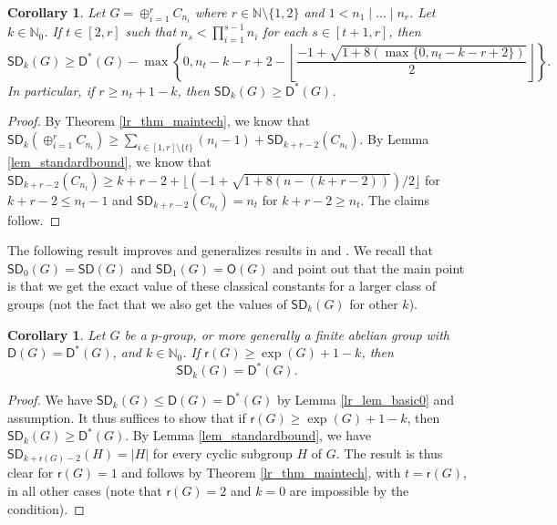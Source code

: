 \documentclass{amsart}
\newtheorem{co}[thm]{Corollary}
\theoremstyle{definition}
\numberwithin{equation}{section}
\begin{document}
\begin{co}
\label{lr_co_gen}
Let $G = \oplus_{i=1}^r C_{n_i}$ where $r\in \mathbb{N}\setminus \{1,2\}$ and $1 < n_1 \mid \dots \mid n_r$. Let $k \in \mathbb{N}_0$.
If $t \in [2,r]$ such that $n_{s} < \prod_{i=1}^{s-1} n_i$ for each $s \in [t+1,r]$, then
\[{\mathsf{SD}}_k(G) \ge 
{\mathsf{D}^{\ast}}(G) -  \max \left \{0,n_t - k-r+2  -\left\lfloor \frac{-1 + \sqrt{1 + 8(\max\{0,n_t-k-r+2\})}}{2}\right\rfloor \right  \}.\]
In particular, if $r \ge n_t +1 -k$, then ${\mathsf{SD}}_k(G)\ge {\mathsf{D}^{\ast}}(G)$.
\end{co}
\begin{proof}
By Theorem \ref{lr_thm_maintech}, we know that
${\mathsf{SD}}_k(\oplus_{i=1}^{r}C_{n_i}) \ge \sum_{i\in [1,r]\setminus \{t\}} (n_i -1)+ {\mathsf{SD}}_{k+r-2}( C_{n_t})$.
By Lemma \ref{lem_standardbound}, we know that ${\mathsf{SD}}_{k+r-2}( C_{n_t}) \ge k+r-2  +\lfloor (-1 + \sqrt{1 + 8(n-(k+r-2))})/2 \rfloor$ for $k+r-2  \le n_t-1$ and ${\mathsf{SD}}_{k+r-2}( C_{n_t})=n_t$ for
$k + r - 2 \ge n_t $. The claims follow.
\end{proof}

 The following result improves and generalizes results in \cite{GaoGe} and \cite{baginski}. We recall that ${\mathsf{SD}}_0(G)={\mathsf{SD}}(G)$ and ${\mathsf{SD}}_1(G)={\mathsf{O}}(G)$ and point out that the main point is that we get the exact value of these classical constants for a larger class of groups (not the fact that we also get the values of ${\mathsf{SD}}_k(G)$ for other $k$).
\begin{co}
\label{lr_co_pgr}
Let $G$ be a $p$-group, or more generally a finite abelian group with ${\mathsf{D}}(G)={\mathsf{D}^{\ast}}(G)$, and $k\in \mathbb{N}_0$.
If $\mathsf{r}(G)\ge \exp(G)+1-k$, then
\[{\mathsf{SD}}_k(G)= {\mathsf{D}^{\ast}}(G).\]
\end{co}
\begin{proof}
We have $ {\mathsf{SD}}_k(G) \le {\mathsf{D}}(G) = {\mathsf{D}^{\ast}}(G) $ by Lemma \ref{lr_lem_basic0} and assumption.
It thus suffices to show that if $ \mathsf{r}(G) \ge \exp(G) + 1 - k $, then
\({\mathsf{SD}}_k(G)\ge {\mathsf{D}^{\ast}}(G).\)
By Lemma \ref{lem_standardbound}, we have ${\mathsf{SD}}_{k+\mathsf{r}(G)-2}(H)= |H|$ for every cyclic subgroup $H$ of $G$.
The result is thus clear for $\mathsf{r}(G)=1$ and follows by Theorem \ref{lr_thm_maintech}, with $t=\mathsf{r}(G)$,
in all other cases (note that $\mathsf{r}(G)=2$ and $k=0$ are impossible by the condition).
\end{proof}
\end{document}
